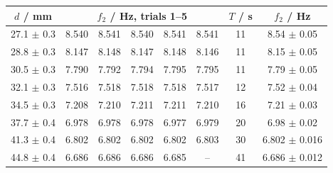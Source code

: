 \begin{tabular}{@{}cccccccc@{}}
\toprule
$d$ / mm & \multicolumn{5}{c}{$f_2$ / Hz, trials 1--5} & $T$ / s & $f_2$ / Hz \\
\midrule
27.1 $\pm$ 0.3 & 8.540 & 8.541 & 8.540 & 8.541 & 8.541 & 11 & 8.54 $\pm$ 0.05 \\
28.8 $\pm$ 0.3 & 8.147 & 8.148 & 8.147 & 8.148 & 8.146 & 11 & 8.15 $\pm$ 0.05 \\
30.5 $\pm$ 0.3 & 7.790 & 7.792 & 7.794 & 7.795 & 7.795 & 11 & 7.79 $\pm$ 0.05 \\
32.1 $\pm$ 0.3 & 7.516 & 7.518 & 7.518 & 7.518 & 7.517 & 12 & 7.52 $\pm$ 0.04 \\
34.5 $\pm$ 0.3 & 7.208 & 7.210 & 7.211 & 7.211 & 7.210 & 16 & 7.21 $\pm$ 0.03 \\
37.7 $\pm$ 0.4 & 6.978 & 6.978 & 6.978 & 6.977 & 6.979 & 20 & 6.98 $\pm$ 0.02 \\
41.3 $\pm$ 0.4 & 6.802 & 6.802 & 6.802 & 6.802 & 6.803 & 30 & 6.802 $\pm$ 0.016 \\
44.8 $\pm$ 0.4 & 6.686 & 6.686 & 6.686 & 6.685 & -- & 41 & 6.686 $\pm$ 0.012 \\
\bottomrule
\end{tabular}